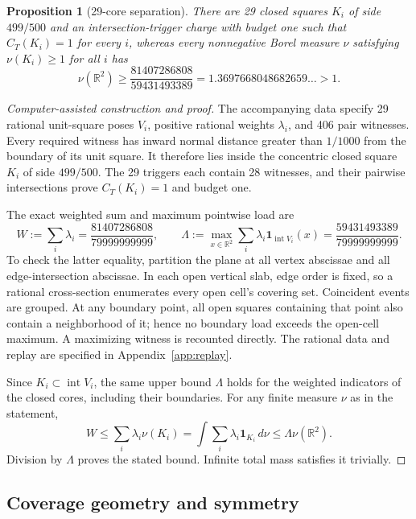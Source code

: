 \documentclass[11pt]{article}
\newtheorem{proposition}[theorem]{Proposition}
\newcommand{\interior}{\operatorname{int}}
\newcommand{\R}{\mathbb R}
\newcommand{\ind}{\mathbf 1}
\begin{document}
\begin{proposition}[29-core separation]\label{prop:separation}
There are 29 closed squares $K_i$ of side $499/500$ and an intersection-trigger
charge with budget one such that $C_T(K_i)=1$ for every $i$, whereas every
nonnegative Borel measure $\nu$ satisfying $\nu(K_i)\ge1$ for all $i$ has
\[
  \nu(\R^2)\ge\frac{81407286808}{59431493389}
  =1.3697668048682659\ldots>1.
\]
\end{proposition}

\begin{proof}[Computer-assisted construction and proof]
The accompanying data specify 29 rational unit-square poses $V_i$, positive
rational weights $\lambda_i$, and 406 pair witnesses. Every required witness
has inward normal distance greater than $1/1000$ from the boundary of its
unit square. It therefore lies inside the concentric closed square $K_i$ of
side $499/500$. The 29 triggers each contain 28 witnesses, and their pairwise
intersections prove $C_T(K_i)=1$ and budget one.

The exact weighted sum and maximum pointwise load are
\[
  W:=\sum_i\lambda_i=\frac{81407286808}{79999999999},\qquad
  \Lambda:=\max_{x\in\R^2}\sum_i\lambda_i
             \ind_{\interior V_i}(x)=\frac{59431493389}{79999999999}.
\]
To check the latter equality, partition the plane at all vertex abscissae and
all edge-intersection abscissae. In each open vertical slab, edge order is
fixed, so a rational cross-section enumerates every open cell's covering
set. Coincident events are grouped. At any boundary point, all open squares
containing that point also contain a neighborhood of it; hence no boundary
load exceeds the open-cell maximum. A maximizing witness is recounted
directly. The rational data and replay are specified in
Appendix~\ref{app:replay}.

Since $K_i\subset\interior V_i$, the same upper bound $\Lambda$ holds for
the weighted indicators of the closed cores, including their boundaries.
For any finite measure $\nu$ as in the statement,
\[
  W\le\sum_i\lambda_i\nu(K_i)
    =\int\sum_i\lambda_i\ind_{K_i}\,d\nu
    \le\Lambda\nu(\R^2).
\]
Division by $\Lambda$ proves the stated bound. Infinite total mass satisfies
it trivially.
\end{proof}

\subsection{Coverage geometry and symmetry}
\end{document}
